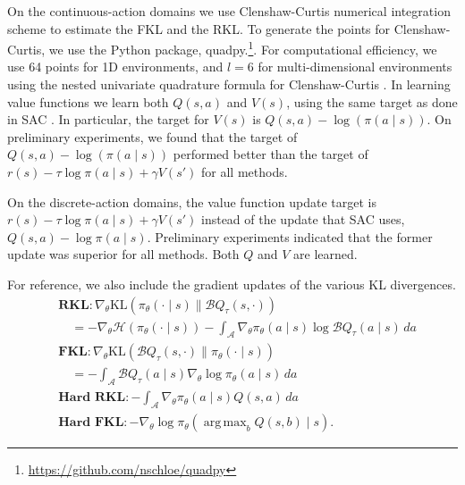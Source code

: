 \documentclass[twoside,11pt]{article}
\DeclareMathOperator*{\argmax}{arg\,max}
\newcommand{\actionspace}{\mathcal{A}}
\newcommand{\KL}{\mathrm{KL}}
\newcommand{\boltzmannQ}{\mathcal{B}Q}
\newcommand{\entropy}{\mathcal{H}}
\begin{document}
On the continuous-action domains we use Clenshaw-Curtis \citep{clenshaw1960method} numerical integration scheme to estimate the FKL and the RKL. To generate the points for Clenshaw-Curtis, we use the Python package, quadpy.\footnote{\url{https://github.com/nschloe/quadpy}}. For computational efficiency, we use 64 points for 1D environments, and $l=6$ for multi-dimensional environments using the nested univariate quadrature formula for Clenshaw-Curtis \citep{gerstner1998numerical}. In learning value functions we learn both $Q(s, a)$ and $V(s)$, using the same target as done in SAC \citep{haarnoja2018soft}. In particular, the target for $V(s)$ is $Q(s, a) - \log(\pi(a \mid s))$. On preliminary experiments, we found that the target of $Q(s, a) - \log(\pi(a \mid s))$ performed better than the target of $r(s) - \tau \log \pi(a \mid s) + \gamma V(s')$ for all methods.

On the discrete-action domains, the value function update target is $r(s) - \tau \log \pi(a \mid s) + \gamma V(s')$ instead of the update that SAC uses, $Q(s, a) - \log \pi(a \mid s)$. Preliminary experiments indicated that the former update was superior for all methods. Both $Q$ and $V$ are learned. 

For reference, we also include the gradient updates of the various KL divergences. 
\begin{align}
    &\textbf{RKL}: \nabla_\theta \KL(\pi_\theta(\cdot \mid s) \parallel \boltzmannQ_\tau(s, \cdot)) \nonumber\\
    &\quad= -\nabla_\theta \entropy(\pi_\theta(\cdot \mid s)) - \int_\actionspace\nabla_\theta \pi_\theta(a \mid s) \log \boltzmannQ_\tau(a \mid s)\, da \label{eq:rkl-gradient}\\
    &\textbf{FKL}: \nabla_\theta \KL(\boltzmannQ_\tau(s, \cdot) \parallel \pi_\theta(\cdot \mid s) )\nonumber\\
    &\quad= - \int_\actionspace  \boltzmannQ_\tau(a \mid s) \nabla_\theta \log \pi_\theta(a \mid s) \, da \label{eq:fkl-gradient} \\
    &\textbf{Hard RKL}: - \int_\actionspace\nabla_\theta \pi_\theta(a \mid s) Q(s, a)\, da \label{eq:hrkl-gradient}\\
    &\textbf{Hard FKL}: -\nabla_\theta \log \pi_\theta \left(\argmax_b Q(s, b) \mid s\right) \label{eq:hfkl-gradient}.
\end{align}
\end{document}
